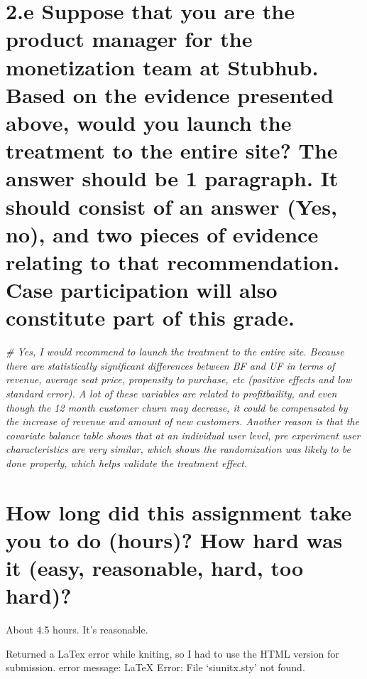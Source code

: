 \documentclass[
]{article}
\newenvironment{Shaded}{\begin{snugshade}}{\end{snugshade}}
\newcommand{\CommentTok}[1]{\textcolor[rgb]{0.56,0.35,0.01}{\textit{#1}}}
\begin{document}
\hypertarget{e-suppose-that-you-are-the-product-manager-for-the-monetization-team-at-stubhub.-based-on-the-evidence-presented-above-would-you-launch-the-treatment-to-the-entire-site-the-answer-should-be-1-paragraph.-it-should-consist-of-an-answer-yes-no-and-two-pieces-of-evidence-relating-to-that-recommendation.-case-participation-will-also-constitute-part-of-this-grade.}{%
\section{2.e Suppose that you are the product manager for the
monetization team at Stubhub. Based on the evidence presented above,
would you launch the treatment to the entire site? The answer should be
1 paragraph. It should consist of an answer (Yes, no), and two pieces of
evidence relating to that recommendation. Case participation will also
constitute part of this
grade.}\label{e-suppose-that-you-are-the-product-manager-for-the-monetization-team-at-stubhub.-based-on-the-evidence-presented-above-would-you-launch-the-treatment-to-the-entire-site-the-answer-should-be-1-paragraph.-it-should-consist-of-an-answer-yes-no-and-two-pieces-of-evidence-relating-to-that-recommendation.-case-participation-will-also-constitute-part-of-this-grade.}}

\begin{Shaded}
\begin{Highlighting}[]
\CommentTok{\# Yes, I would recommend to launch the treatment to the entire site. Because there are statistically significant differences between BF and UF in terms of revenue, average seat price, propensity to purchase, etc (positive effects and low standard error). A lot of these variables are related to profitbaility, and even though the 12 month customer churn may decrease, it could be compensated by the increase of revenue and amount of new customers. Another reason is that the covariate balance table shows that at an individual user level, pre experiment user characteristics are very similar, which shows the randomization was likely to be done properly, which helps validate the treatment effect.}
\end{Highlighting}
\end{Shaded}

\hypertarget{how-long-did-this-assignment-take-you-to-do-hours-how-hard-was-it-easy-reasonable-hard-too-hard}{%
\section{How long did this assignment take you to do (hours)? How hard
was it (easy, reasonable, hard, too
hard)?}\label{how-long-did-this-assignment-take-you-to-do-hours-how-hard-was-it-easy-reasonable-hard-too-hard}}

About 4.5 hours. It's reasonable.

Returned a LaTex error while kniting, so I had to use the HTML version
for submission. error message: LaTeX Error: File `siunitx.sty' not
found.
\end{document}
